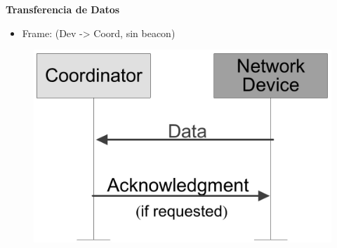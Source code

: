 \documentclass[aspectratio=169]{beamer}
\begin{document}
\begin{frame}{\textbf{Transferencia de Datos}}
\begin{minipage}[c]{1.0\linewidth}
	\begin{minipage}[c]{0.6\linewidth}
		\begin{itemize}
			\item Frame: (Dev -> Coord, sin beacon)
			\vspace{10px}
	  	\end{itemize}	
	\end{minipage}
	\begin{minipage}[c]{0.35\linewidth}
		\begin{figure}[H]
			\includegraphics[width=1\textwidth]{./imagenes/dev-coord-sinbeacon.jpg}
		\end{figure}	  	  	
	\end{minipage}
\end{minipage}
\end{frame}
\end{document}

